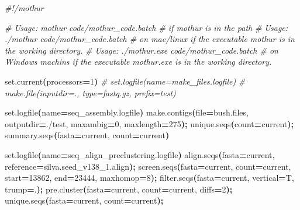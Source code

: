\documentclass[
  12pt,
  openany]{book}
\newenvironment{Shaded}{\begin{snugshade}}{\end{snugshade}}
\newcommand{\CommentTok}[1]{\textcolor[rgb]{0.56,0.35,0.01}{\textit{#1}}}
\newcommand{\ErrorTok}[1]{\textcolor[rgb]{0.64,0.00,0.00}{\textbf{#1}}}
\newcommand{\ExtensionTok}[1]{#1}
\newcommand{\KeywordTok}[1]{\textcolor[rgb]{0.13,0.29,0.53}{\textbf{#1}}}
\newcommand{\NormalTok}[1]{#1}
\newcommand{\OperatorTok}[1]{\textcolor[rgb]{0.81,0.36,0.00}{\textbf{#1}}}
\newcommand{\VariableTok}[1]{\textcolor[rgb]{0.00,0.00,0.00}{#1}}
\begin{document}
\begin{Shaded}
\begin{Highlighting}[]
\CommentTok{\#!/mothur}

\CommentTok{\# Usage: mothur code/mothur\_code.batch \# if mothur is in the path}
\CommentTok{\# Usage: ./mothur code/mothur\_code.batch \# on mac/linux if the executable \textasciigrave{}mothur\textasciigrave{} is in the working directory.}
\CommentTok{\# Usage: ./mothur.exe code/mothur\_code.batch \# on Windows machins if the executable \textasciigrave{}mothur.exe\textasciigrave{} is in the working directory.}

\ExtensionTok{set.current}\ErrorTok{(}\VariableTok{processors}\OperatorTok{=}\NormalTok{1}\KeywordTok{)}
\CommentTok{\# set.logfile(name=make\_files.logfile)}
\CommentTok{\# make.file(inputdir=., type=fastq.gz, prefix=test)}

\ExtensionTok{set.logfile}\ErrorTok{(}\VariableTok{name}\OperatorTok{=}\NormalTok{seq\_assembly.logfile}\KeywordTok{)}
\ExtensionTok{make.contigs}\ErrorTok{(}\VariableTok{file}\OperatorTok{=}\NormalTok{bush.files, }\VariableTok{outputdir}\OperatorTok{=}\NormalTok{./test, }\VariableTok{maxambig}\OperatorTok{=}\NormalTok{0, }\VariableTok{maxlength}\OperatorTok{=}\NormalTok{275}\KeywordTok{);}
\ExtensionTok{unique.seqs}\ErrorTok{(}\VariableTok{count}\OperatorTok{=}\NormalTok{current}\KeywordTok{);}
\ExtensionTok{summary.seqs}\ErrorTok{(}\VariableTok{fasta}\OperatorTok{=}\NormalTok{current, }\VariableTok{count}\OperatorTok{=}\NormalTok{current}\KeywordTok{)}

\ExtensionTok{set.logfile}\ErrorTok{(}\VariableTok{name}\OperatorTok{=}\NormalTok{seq\_align\_preclustering.logfile}\KeywordTok{)}
\ExtensionTok{align.seqs}\ErrorTok{(}\VariableTok{fasta}\OperatorTok{=}\NormalTok{current, }\VariableTok{reference}\OperatorTok{=}\NormalTok{silva.seed\_v138\_1.align}\KeywordTok{);}
\ExtensionTok{screen.seqs}\ErrorTok{(}\VariableTok{fasta}\OperatorTok{=}\NormalTok{current, }\VariableTok{count}\OperatorTok{=}\NormalTok{current, }\VariableTok{start}\OperatorTok{=}\NormalTok{13862, }\VariableTok{end}\OperatorTok{=}\NormalTok{23444, }\VariableTok{maxhomop}\OperatorTok{=}\NormalTok{8}\KeywordTok{);}
\ExtensionTok{filter.seqs}\ErrorTok{(}\VariableTok{fasta}\OperatorTok{=}\NormalTok{current, }\VariableTok{vertical}\OperatorTok{=}\NormalTok{T, }\VariableTok{trump}\OperatorTok{=}\NormalTok{.}\KeywordTok{);}
\ExtensionTok{pre.cluster}\ErrorTok{(}\VariableTok{fasta}\OperatorTok{=}\NormalTok{current, }\VariableTok{count}\OperatorTok{=}\NormalTok{current, }\VariableTok{diffs}\OperatorTok{=}\NormalTok{2}\KeywordTok{);}
\ExtensionTok{unique.seqs}\ErrorTok{(}\VariableTok{fasta}\OperatorTok{=}\NormalTok{current, }\VariableTok{count}\OperatorTok{=}\NormalTok{current}\KeywordTok{);}


\end{Highlighting}
\end{Shaded}
\end{document}
